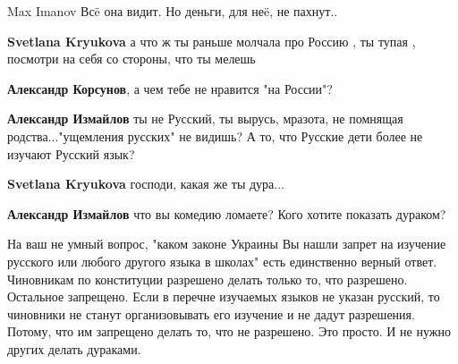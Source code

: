 \begin{itemize}
\begin{itemize}
Max Imanov
Всë она видит.
Но деньги, для неë, не пахнут..

 
\textbf{Svetlana Kryukova} а что ж ты раньше молчала про Россию , ты тупая , посмотри на себя со стороны, что ты мелешь

 
\textbf{Александр Корсунов}, а чем тебе не нравится "на России"?

 
\textbf{Александр Измайлов} ты не Русский, ты вырусь, мразота, не помнящая родства..."ущемления русских" не видишь? А то, что Русские дети более не изучают Русский язык?

 
\textbf{Svetlana Kryukova} господи, какая же ты дура...

 
\textbf{Александр Измайлов} что вы комедию ломаете? Кого хотите показать дураком?

На ваш не умный вопрос, "каком законе Украины Вы нашли запрет на изучение
русского или любого другого языка в школах" есть единственно верный ответ.
Чиновникам по конституции разрешено делать только то, что разрешено. Остальное
запрещено. Если в перечне изучаемых языков не указан русский, то чиновники не
станут организовывать его изучение и не дадут разрешения. Потому, что им
запрещено делать то, что не разрешено. Это просто. И не нужно других делать
дураками.


\end{itemize}
\end{itemize}
